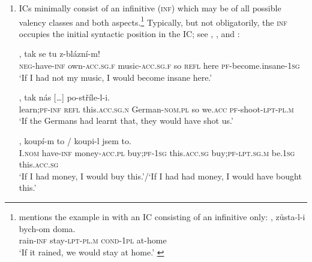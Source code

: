 \documentclass[output=paper,colorlinks,citecolor=brown,
modfonts,newtxmath
]{langscibook}
\begin{document}
\begin{enumerate}

\item ICs minimally consist of an infinitive (\textsc{inf}) which may be of all possible valency classes and both aspects.\footnote{\citet{Svoboda1959} mentions the example in  with an IC consisting of an infinitive only:
\ea\label{ex:rain}
, zůsta-l-i bych-om doma.\\
     {} rain-\textsc{inf} stay-\textsc{lpt-pl.m} \textsc{cond-1pl} {at-home}\\
\glt `If it rained, we would stay at home.' \hfill \citep[Czech;][167]{Svoboda1959} 
\z} 
Typically, but not obligatorily, the \textsc{inf} occupies the initial syntactic position in the IC; see , , and :

\ea\label{ex:music}
, tak se tu z-blázní-m!\\
     {} \textsc{neg}-have-\textsc{inf} own-\textsc{acc.sg.f} music-\textsc{acc.sg.f} so \textsc{refl} here \textsc{pf}-{become.insane}-\textsc{1sg}\\
\glt `If I had not my music, I would become insane here.' \\ \hfill \citep[Czech;][4]{Milotova2012}
\z

\ea\label{ex:Germans}
, tak nás {[\ldots]}\hspace{-2pt} po-stříle-l-i.\\ 
     {} learn;\textsc{pf}-\textsc{inf} \textsc{refl} this.\textsc{acc.sg.n} German-\textsc{nom.pl} so we.\textsc{acc} {} \textsc{pf}-shoot-\textsc{lpt-pl.m}\\
\glt `If the Germans had learnt that, they would have shot us.' \\ \hfill \citep[Czech;][371]{Meyer2010}
\z

\ea\label{ex:money}
, koupí-m to / koupi-l jsem to.\\ 
     {} I.\textsc{nom} have-\textsc{inf} money-\textsc{acc.pl} buy;\textsc{pf}-\textsc{1sg} this.\textsc{acc.sg} {} buy;\textsc{pf}-\textsc{lpt.sg.m} be.\textsc{1sg} this.\textsc{acc.sg}\\
\glt `If I had money, I would buy this.'/`If I had had money, I would have bought this.' \hfill \citep[Czech;][683]{Travnicek1951}
\z


\end{enumerate}
\end{document}
